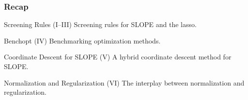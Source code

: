 \documentclass[aspectratio=1610,onlytextwidth]{beamer}
\begin{document}
%
%

\begin{frame}[c]
  \frametitle{Recap}

  \begin{block}{Screening Rules (I--III)}
    Screening rules for SLOPE and the lasso.
  \end{block}

  \pause

  \begin{block}{Benchopt (IV)}
    Benchmarking optimization methods.
  \end{block}

  \pause

  \begin{block}{Coordinate Descent for SLOPE (V)}
    A hybrid coordinate descent method for SLOPE.
  \end{block}

  \pause

  \begin{block}{Normalization and Regularization (VI)}
    The interplay between normalization and regularization.
  \end{block}

\end{frame}
\end{document}
